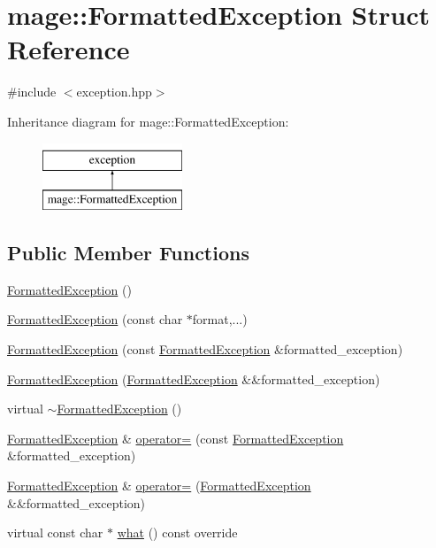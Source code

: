 \hypertarget{structmage_1_1_formatted_exception}{}\section{mage\+:\+:Formatted\+Exception Struct Reference}
\label{structmage_1_1_formatted_exception}


{\ttfamily \#include $<$exception.\+hpp$>$}

Inheritance diagram for mage\+:\+:Formatted\+Exception\+:\begin{figure}[H]
\begin{center}
\leavevmode
\includegraphics[height=2.000000cm]{structmage_1_1_formatted_exception}
\end{center}
\end{figure}
\subsection*{Public Member Functions}
\begin{DoxyCompactItemize}
\item 
\hyperlink{structmage_1_1_formatted_exception_a77b82a969ec33a3aacec74a5adc4ab8b}{Formatted\+Exception} ()
\item 
\hyperlink{structmage_1_1_formatted_exception_a3fe833a49052a2db99c023b1b1d43621}{Formatted\+Exception} (const char $\ast$format,...)
\item 
\hyperlink{structmage_1_1_formatted_exception_afd5d6b7a9db65b127badbf498186ebe8}{Formatted\+Exception} (const \hyperlink{structmage_1_1_formatted_exception}{Formatted\+Exception} \&formatted\+\_\+exception)
\item 
\hyperlink{structmage_1_1_formatted_exception_ab1371b0a079fc50fcae39722e5e29cb2}{Formatted\+Exception} (\hyperlink{structmage_1_1_formatted_exception}{Formatted\+Exception} \&\&formatted\+\_\+exception)
\item 
virtual \hyperlink{structmage_1_1_formatted_exception_a7bd56fe92b62d08b5ca4fb86592f1302}{$\sim$\+Formatted\+Exception} ()
\item 
\hyperlink{structmage_1_1_formatted_exception}{Formatted\+Exception} \& \hyperlink{structmage_1_1_formatted_exception_acc0ecbe1d510c5103ff4fd5b7054213b}{operator=} (const \hyperlink{structmage_1_1_formatted_exception}{Formatted\+Exception} \&formatted\+\_\+exception)
\item 
\hyperlink{structmage_1_1_formatted_exception}{Formatted\+Exception} \& \hyperlink{structmage_1_1_formatted_exception_aed7565e923543206710aa5f71ba5893a}{operator=} (\hyperlink{structmage_1_1_formatted_exception}{Formatted\+Exception} \&\&formatted\+\_\+exception)
\item 
virtual const char $\ast$ \hyperlink{structmage_1_1_formatted_exception_af4a63770e4f7091868d9e1e2382c1e70}{what} () const override
\end{DoxyCompactItemize}
